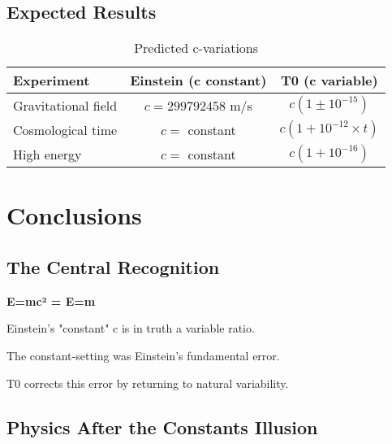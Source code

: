 \documentclass[12pt,a4paper]{article}
\begin{document}
{{{{{{{{{{{{													\subsection{Expected Results}
													
													\begin{table}[htbp]
														\centering
														\begin{tabular}{|l|c|c|}
															\hline
															\textbf{Experiment} & \textbf{Einstein (c constant)} & \textbf{T0 (c variable)} \\
															\hline
															Gravitational field & $c = 299792458$ m/s & $c(1 \pm 10^{-15})$ \\
															Cosmological time & $c = $ constant & $c(1 + 10^{-12} \times t)$ \\
															High energy & $c = $ constant & $c(1 + 10^{-16})$ \\
															\hline
														\end{tabular}
														\caption{Predicted c-variations}
													\end{table}
													
													\section{Conclusions}
													
													\subsection{The Central Recognition}
													
													\begin{tcolorbox}[colback=green!5!white,colframe=green!75!black,title=The Fundamental Truth]
														\textbf{E=mc² = E=m}
														
														Einstein's "constant" c is in truth a variable ratio.
														
														The constant-setting was Einstein's fundamental error.
														
														T0 corrects this error by returning to natural variability.
													\end{tcolorbox}
													
													\subsection{Physics After the Constants Illusion}
													
}}}}}}}}}}}}
\end{document}
